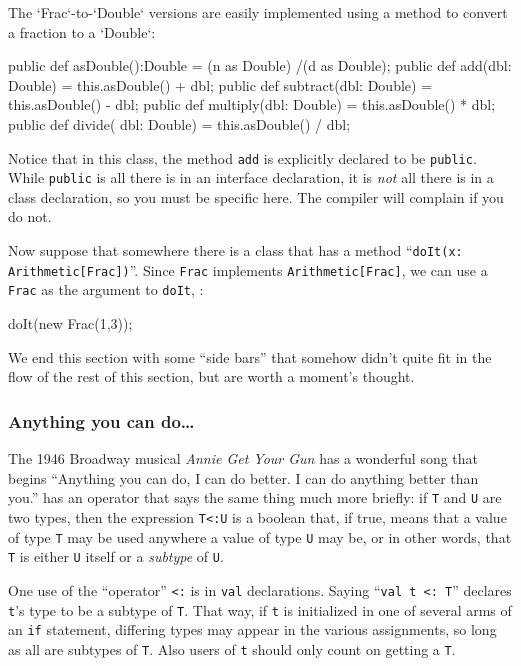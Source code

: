 The \xcd`Frac`-to-\xcd`Double` versions are easily implemented using 
a method to convert a fraction to a \xcd`Double`: 

\begin{xtennum}[]
  public def asDouble():Double = (n as Double) /(d as Double);
  public def add(dbl: Double) = this.asDouble() + dbl;
  public def subtract(dbl: Double) = this.asDouble() - dbl;
  public def multiply(dbl: Double) = this.asDouble() * dbl;
  public def divide(  dbl: Double) = this.asDouble() / dbl;
\end{xtennum}


Notice that in this class, the method {\tt add} is explicitly declared to be
{\tt public}.  While {\tt public} is all there is in an interface declaration,
it is {\em not} all there is in a class declaration, so you must be specific
here.  The compiler will complain if you do not.

Now suppose that somewhere there is a class that has a method ``{\tt doIt(x:
Arith\-me\-tic[Frac])}''. Since {\tt Frac} implements {\tt Arithmetic[Frac]},
we can use a {\tt Frac} as the argument to {\tt doIt}, \eg:

\begin{xtennum}[]
    doIt(new Frac(1,3));
\end{xtennum}



We end this section with some ``side bars'' that somehow didn't quite fit in 
the flow of the rest of this section, but are worth a moment's thought.

\subsubsection{ Anything you can do\ldots}\label{subsub:type:anything}
The 1946 Broadway musical {\em Annie Get Your
Gun} has a wonderful song that begins ``Anything you can do, I can do better. 
I can do anything better than you.''  \Xten{} has an operator that says the
same thing much more briefly: if {\tt T} and {\tt U} are two types, then the
expression {\tt T<:U} is a boolean that, if true, means that a value of type
{\tt T} may be used anywhere a value of type {\tt U} may be, or in other words,
that {\tt T} is either {\tt U} itself or a {\em subtype} of {\tt U}. 

One use of the ``operator'' {\tt <:} is in {\tt val} declarations. 
Saying ``{\tt val t <: T}'' declares {\tt t}'s type to be a subtype of {\tt T}. 
That way, if {\tt t} is initialized in one of several arms of an {\tt if}
statement, differing types may appear in the various assignments, so long as all
are subtypes of {\tt T}.  Also users of {\tt t} should only count on getting a
{\tt T}.

